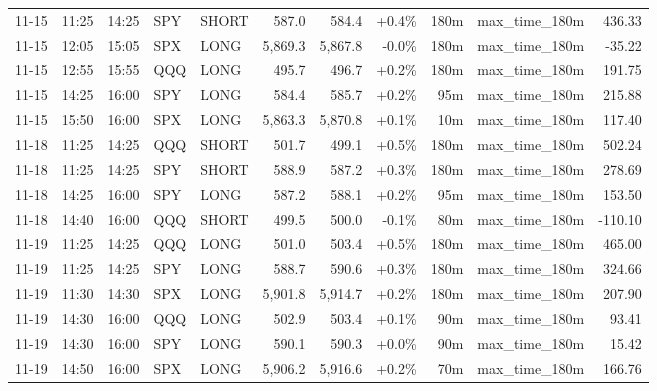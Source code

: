 \documentclass[11pt,a4paper,twoside]{article}
\begin{document}
\begin{center}
\begin{longtable}{>{\color{txtmain}}l l l l l r r r r >{\color{txtmain}}l r}
11-15 & 11:25 & 14:25 & SPY & SHORT & 587.0 & 584.4 & \textcolor{wingreen}{+0.4\%} & 180m & max\_time\_180m & \textcolor{wingreen}{436.33} \\
11-15 & 12:05 & 15:05 & SPX & LONG & 5,869.3 & 5,867.8 & \textcolor{lossred}{-0.0\%} & 180m & max\_time\_180m & \textcolor{lossred}{-35.22} \\
11-15 & 12:55 & 15:55 & QQQ & LONG & 495.7 & 496.7 & \textcolor{wingreen}{+0.2\%} & 180m & max\_time\_180m & \textcolor{wingreen}{191.75} \\
11-15 & 14:25 & 16:00 & SPY & LONG & 584.4 & 585.7 & \textcolor{wingreen}{+0.2\%} & 95m & max\_time\_180m & \textcolor{wingreen}{215.88} \\
11-15 & 15:50 & 16:00 & SPX & LONG & 5,863.3 & 5,870.8 & \textcolor{wingreen}{+0.1\%} & 10m & max\_time\_180m & \textcolor{wingreen}{117.40} \\
11-18 & 11:25 & 14:25 & QQQ & SHORT & 501.7 & 499.1 & \textcolor{wingreen}{+0.5\%} & 180m & max\_time\_180m & \textcolor{wingreen}{502.24} \\
11-18 & 11:25 & 14:25 & SPY & SHORT & 588.9 & 587.2 & \textcolor{wingreen}{+0.3\%} & 180m & max\_time\_180m & \textcolor{wingreen}{278.69} \\
11-18 & 14:25 & 16:00 & SPY & LONG & 587.2 & 588.1 & \textcolor{wingreen}{+0.2\%} & 95m & max\_time\_180m & \textcolor{wingreen}{153.50} \\
11-18 & 14:40 & 16:00 & QQQ & SHORT & 499.5 & 500.0 & \textcolor{lossred}{-0.1\%} & 80m & max\_time\_180m & \textcolor{lossred}{-110.10} \\
11-19 & 11:25 & 14:25 & QQQ & LONG & 501.0 & 503.4 & \textcolor{wingreen}{+0.5\%} & 180m & max\_time\_180m & \textcolor{wingreen}{465.00} \\
11-19 & 11:25 & 14:25 & SPY & LONG & 588.7 & 590.6 & \textcolor{wingreen}{+0.3\%} & 180m & max\_time\_180m & \textcolor{wingreen}{324.66} \\
11-19 & 11:30 & 14:30 & SPX & LONG & 5,901.8 & 5,914.7 & \textcolor{wingreen}{+0.2\%} & 180m & max\_time\_180m & \textcolor{wingreen}{207.90} \\
11-19 & 14:30 & 16:00 & QQQ & LONG & 502.9 & 503.4 & \textcolor{wingreen}{+0.1\%} & 90m & max\_time\_180m & \textcolor{wingreen}{93.41} \\
11-19 & 14:30 & 16:00 & SPY & LONG & 590.1 & 590.3 & \textcolor{wingreen}{+0.0\%} & 90m & max\_time\_180m & \textcolor{wingreen}{15.42} \\
11-19 & 14:50 & 16:00 & SPX & LONG & 5,906.2 & 5,916.6 & \textcolor{wingreen}{+0.2\%} & 70m & max\_time\_180m & \textcolor{wingreen}{166.76} \\

\end{longtable}
\end{center}
\end{document}

